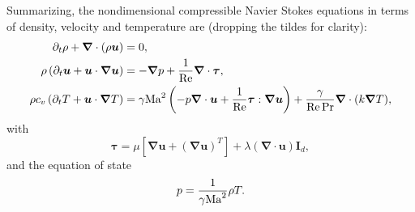 \documentclass{article}
\begin{document}
Summarizing, the nondimensional compressible Navier Stokes equations in terms of density, velocity and temperature are (dropping the tildes for clarity):
\begin{align*}
	\partial_{t} \rho + \bm{\nabla}\cdot (\rho \bm{u})                    & = 0,                                                                                                                                                                   \\
	\rho\left(\partial_{t} \bm{u} + \bm{u}\cdot \bm{\nabla} \bm{u}\right) & = - \bm{\nabla} p + \frac{1}{\mathrm{Re}} \bm{\nabla} \cdot \bm{\tau},                                                                                                        \\
	\rho c_v \left(\partial_{t} T + \bm{u} \cdot \bm{\nabla} T\right)     & = \gamma\mathrm{Ma}^2 \left(- p \bm{\nabla} \cdot \bm{u} + \frac{1}{\mathrm{Re}} \bm{\tau} : \bm{\nabla} \bm{u}\right) + \frac{\gamma}{\mathrm{Re} \Pr} \bm{\nabla} \cdot (k \bm{\nabla} T),
\end{align*}
with
\[\bm{\tau} = \mu \left[ \bm{\nabla} \bm{u} + (\bm{\nabla} \bm{u})^T\right] + \lambda (\bm{\nabla} \cdot \bm{u}) \bm{I}_d,\]
and the equation of state
\[p = \frac{1}{\gamma \mathrm{Ma}^2}\rho T.\]
\end{document}
